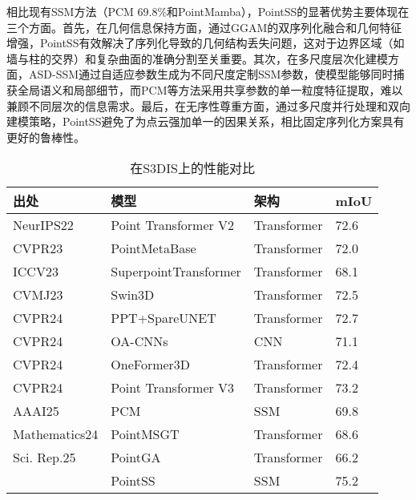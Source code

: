 \documentclass[preprint,12pt]{elsarticle}
\begin{document}
相比现有SSM方法（PCM 69.8\%和PointMamba），PointSS的显著优势主要体现在三个方面。首先，在几何信息保持方面，通过GGAM的双序列化融合和几何特征增强，PointSS有效解决了序列化导致的几何结构丢失问题，这对于边界区域（如墙与柱的交界）和复杂曲面的准确分割至关重要。其次，在多尺度层次化建模方面，ASD-SSM通过自适应参数生成为不同尺度定制SSM参数，使模型能够同时捕获全局语义和局部细节，而PCM等方法采用共享参数的单一粒度特征提取，难以兼顾不同层次的信息需求。最后，在无序性尊重方面，通过多尺度并行处理和双向建模策略，PointSS避免了为点云强加单一的因果关系，相比固定序列化方案具有更好的鲁棒性。
\begin{table}[htbp!]
	\caption{在S3DIS上的性能对比}
\label{tab:s3dis}
	\begin{tabular}{@{}llll@{}}
		\toprule
		\textbf{出处}  & \textbf{模型}           & \textbf{架构} & \textbf{mIoU} \\ \midrule
		NeurIPS22 & Point Transformer V2\cite{ptv2}  & Transformer & 72.6          \\
		CVPR23     & PointMetaBase\cite{pmb}         & Transformer & 72.0          \\
		ICCV23     & SuperpointTransformer\cite{spt} & Transformer & 68.1          \\
		CVMJ23     & Swin3D\cite{Swin3D}                & Transformer & 72.5          \\
		CVPR24     & PPT+SpareUNET\cite{ppt}         & Transformer & 72.7          \\
		CVPR24     & OA-CNNs\cite{oacnn}               & CNN         & 71.1          \\
		CVPR24     & OneFormer3D\cite{OneFormer3D}           & Transformer & 72.4          \\
		CVPR24     & Point Transformer V3\cite{ptv3}           & Transformer & 73.2          \\
		AAAI25    & PCM\cite{pcm}                   & SSM         & 69.8         \\
		Mathematics24 & PointMSGT\cite{pointmsgt}      & Transformer & 68.6         \\
		Sci. Rep.25 & PointGA\cite{pointga}           & Transformer & 66.2         \\
		& PointSS               &SSM           & 75.2          \\ \bottomrule
	\end{tabular}
		\centering


\end{table}
\end{document}
